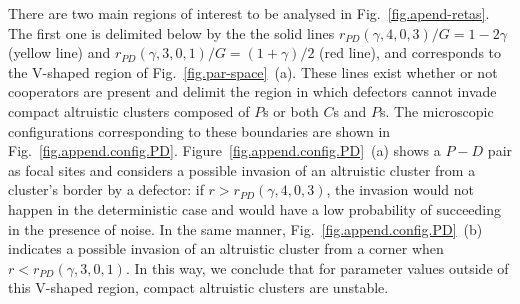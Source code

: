 \documentclass[5p]{elsarticle}
\begin{document}
There are two main regions of interest to be analysed in Fig.~\ref{fig.apend-retas}. The first one is delimited below by the the solid lines $r_{PD}(\gamma, 4, 0, 3)/G=1-2\gamma$ (yellow line) and $r_{PD}(\gamma, 3, 0, 1)/G = (1+\gamma)/2$ (red line), and corresponds to the V-shaped region of Fig.~\ref{fig.par-space}~(a).  These lines exist whether or not cooperators are present and  delimit the region in which defectors cannot invade compact altruistic clusters composed of $P$s or both $C$s and $P$s. The microscopic configurations corresponding to these boundaries are shown in Fig.~\ref{fig.append.config.PD}. Figure~\ref{fig.append.config.PD}~(a) shows a $P-D$ pair as focal sites and considers a possible invasion of an altruistic cluster from a cluster's border by a defector: if  $r >r_{PD}(\gamma,4,0,3)$, the invasion would not happen in the deterministic case and would have a low probability of succeeding in the presence of noise. In the same manner, Fig.~\ref{fig.append.config.PD}~(b) indicates a possible invasion of an altruistic cluster from a corner when $ r < r_{PD}(\gamma,3,0,1)$. In this way, we conclude that for parameter values outside of this V-shaped region, compact altruistic clusters are unstable. 
\end{document}

